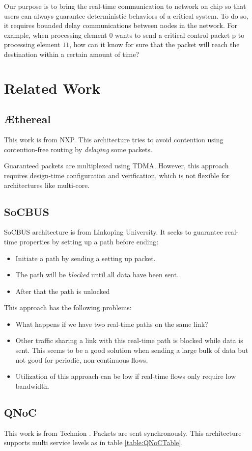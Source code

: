 \documentclass[a4]{article}
\begin{document}
Our purpose is to bring the real-time communication to network on chip so that 
users can always guarantee deterministic behaviors of a critical system. To do 
so, it requires bounded delay communications between nodes in the network. 
For example, when processing element $0$ wants to send a critical control packet 
p to processing element $11$, how can it know for sure that the packet will
reach the destination within a certain amount of time? 

\section{Related Work}
\subsection{\AE thereal}
This work \cite{Goossens_chapter4} is from NXP. This architecture tries to avoid
contention using contention-free routing by {\em delaying} some packets. 

Guaranteed packets are multiplexed using TDMA. However, this approach requires
design-time configuration and verification, which is not flexible for architectures
like multi-core.
\subsection{SoCBUS}
SoCBUS architecture \cite{SoCBUS} is from Linkoping University. It seeks to 
guarantee real-time properties by setting up a path before ending:
\begin{itemize}
\item Initiate a path by sending a setting up packet.
\item The path will be {\em blocked} until all data have been sent.
\item After that the path is unlocked
\end{itemize}
This approach has the following problems: 
\begin{itemize}
\item What happens if we have two real-time paths on the same link?
\item Other traffic sharing a link with this real-time path is blocked while 
data is sent. This seems to be a good solution when sending a large bulk of data 
but not good for periodic, non-continuous flows.
\item Utilization of this approach can be low if real-time flows only require
low bandwidth.
\end{itemize}
\subsection{QNoC}
This work is from Technion \cite{QNoC}. Packets are sent synchronously. 
This architecture supports multi service levels as in table \ref{table:QNoCTable}.
\end{document}
